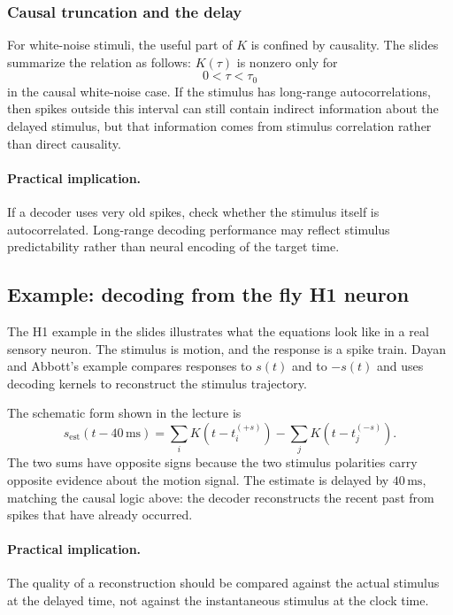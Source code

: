 \subsubsection{Causal truncation and the delay}

For white-noise stimuli, the useful part of $K$ is confined by causality. The slides summarize the relation as follows: $K(\tau)$ is nonzero only for
\[
    0<\tau<\tau_0
\]
in the causal white-noise case. If the stimulus has long-range autocorrelations, then spikes outside this interval can still contain indirect information about the delayed stimulus, but that information comes from stimulus correlation rather than direct causality.

\paragraph{Practical implication.}
If a decoder uses very old spikes, check whether the stimulus itself is autocorrelated. Long-range decoding performance may reflect stimulus predictability rather than neural encoding of the target time.

\subsection{Example: decoding from the fly H1 neuron}

The H1 example in the slides illustrates what the equations look like in a real sensory neuron. The stimulus is motion, and the response is a spike train. Dayan and Abbott's example compares responses to $s(t)$ and to $-s(t)$ and uses decoding kernels to reconstruct the stimulus trajectory.

The schematic form shown in the lecture is
\[
    s_{\mathrm{est}}(t-40\,\mathrm{ms})
    =
    \sum_i K(t-t_i^{(+s)})
    -
    \sum_j K(t-t_j^{(-s)}).
\]
The two sums have opposite signs because the two stimulus polarities carry opposite evidence about the motion signal. The estimate is delayed by $40\,\mathrm{ms}$, matching the causal logic above: the decoder reconstructs the recent past from spikes that have already occurred.

\paragraph{Practical implication.}
The quality of a reconstruction should be compared against the actual stimulus at the delayed time, not against the instantaneous stimulus at the clock time.

